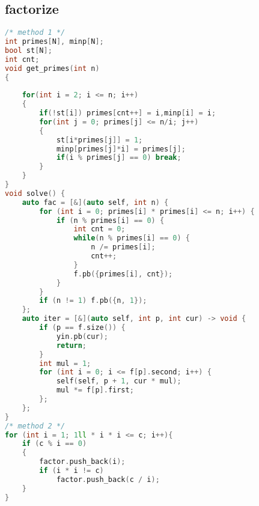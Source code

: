 \subsection{factorize}
\begin{lstlisting}[language=c++]
/* method 1 */
int primes[N], minp[N];
bool st[N];
int cnt;
void get_primes(int n)
{
    
    for(int i = 2; i <= n; i++)
    {
        if(!st[i]) primes[cnt++] = i,minp[i] = i;
        for(int j = 0; primes[j] <= n/i; j++)
        {
            st[i*primes[j]] = 1;
            minp[primes[j]*i] = primes[j];
            if(i % primes[j] == 0) break;
        }
    }
}
void solve() {
    auto fac = [&](auto self, int n) {
        for (int i = 0; primes[i] * primes[i] <= n; i++) {
            if (n % primes[i] == 0) {
                int cnt = 0;
                while(n % primes[i] == 0) {
                    n /= primes[i];
                    cnt++;
                }
                f.pb({primes[i], cnt});
            }
        }
        if (n != 1) f.pb({n, 1});
    };
    auto iter = [&](auto self, int p, int cur) -> void {
        if (p == f.size()) {
            yin.pb(cur);
            return;
        }
        int mul = 1;
        for (int i = 0; i <= f[p].second; i++) {
            self(self, p + 1, cur * mul);
            mul *= f[p].first;
        };
    };
}
/* method 2 */
for (int i = 1; 1ll * i * i <= c; i++){
    if (c % i == 0)
    {
        factor.push_back(i);
        if (i * i != c)
            factor.push_back(c / i);
    }
}
\end{lstlisting}